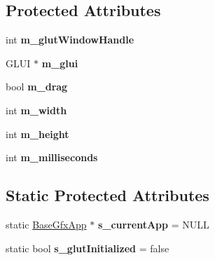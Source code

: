 \subsection*{Protected Attributes}
\begin{DoxyCompactItemize}
\item 
int {\bfseries m\+\_\+glut\+Window\+Handle}\hypertarget{classBaseGfxApp_ad8697d6fdd10e6f336c3a662016b4fa7}{}\label{classBaseGfxApp_ad8697d6fdd10e6f336c3a662016b4fa7}

\item 
G\+L\+UI $\ast$ {\bfseries m\+\_\+glui}\hypertarget{classBaseGfxApp_a6eb1673b80283727221da2242211af1d}{}\label{classBaseGfxApp_a6eb1673b80283727221da2242211af1d}

\item 
bool {\bfseries m\+\_\+drag}\hypertarget{classBaseGfxApp_a2e70a389224f8affe7c137f7e20dc8c1}{}\label{classBaseGfxApp_a2e70a389224f8affe7c137f7e20dc8c1}

\item 
int {\bfseries m\+\_\+width}\hypertarget{classBaseGfxApp_a7e5ef1c8f25fe081b4a1fd4ce6a96e07}{}\label{classBaseGfxApp_a7e5ef1c8f25fe081b4a1fd4ce6a96e07}

\item 
int {\bfseries m\+\_\+height}\hypertarget{classBaseGfxApp_ac078e4fc20b5c2fe0c744966b850b412}{}\label{classBaseGfxApp_ac078e4fc20b5c2fe0c744966b850b412}

\item 
int {\bfseries m\+\_\+milliseconds}\hypertarget{classBaseGfxApp_a72e7753eb311a758240ef4998e7130c8}{}\label{classBaseGfxApp_a72e7753eb311a758240ef4998e7130c8}

\end{DoxyCompactItemize}
\subsection*{Static Protected Attributes}
\begin{DoxyCompactItemize}
\item 
static \hyperlink{classBaseGfxApp}{Base\+Gfx\+App} $\ast$ {\bfseries s\+\_\+current\+App} = N\+U\+LL\hypertarget{classBaseGfxApp_a65ba89b98af31e2649a0546631931000}{}\label{classBaseGfxApp_a65ba89b98af31e2649a0546631931000}

\item 
static bool {\bfseries s\+\_\+glut\+Initialized} = false\hypertarget{classBaseGfxApp_afa4690383ea27713016ef75b9fb1e42f}{}\label{classBaseGfxApp_afa4690383ea27713016ef75b9fb1e42f}

\end{DoxyCompactItemize}


